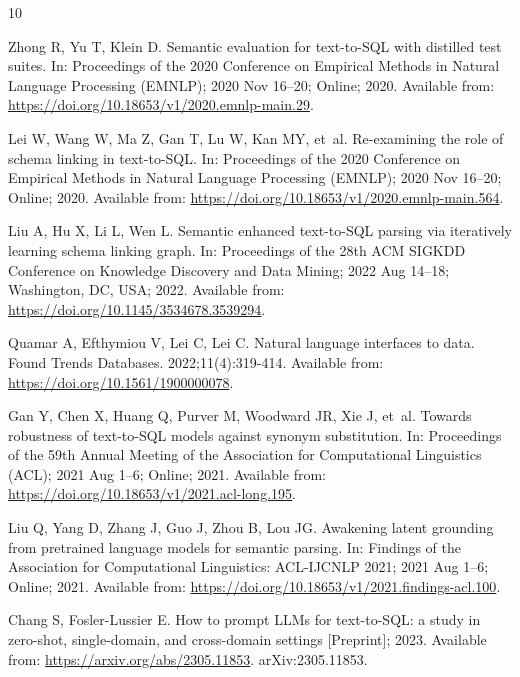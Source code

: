 \begin{thebibliography}{10}

Zhong R, Yu T, Klein D.
\newblock Semantic evaluation for text-to-SQL with distilled test suites.
\newblock In: Proceedings of the 2020 Conference on Empirical Methods in
  Natural Language Processing (EMNLP); 2020 Nov 16--20; Online; 2020. Available
  from: \url{https://doi.org/10.18653/v1/2020.emnlp-main.29}.

Lei W, Wang W, Ma Z, Gan T, Lu W, Kan MY, et~al.
\newblock Re-examining the role of schema linking in text-to-SQL.
\newblock In: Proceedings of the 2020 Conference on Empirical Methods in
  Natural Language Processing (EMNLP); 2020 Nov 16--20; Online; 2020. Available
  from: \url{https://doi.org/10.18653/v1/2020.emnlp-main.564}.

Liu A, Hu X, Li L, Wen L.
\newblock Semantic enhanced text-to-SQL parsing via iteratively learning schema
  linking graph.
\newblock In: Proceedings of the 28th ACM SIGKDD Conference on Knowledge
  Discovery and Data Mining; 2022 Aug 14--18; Washington, DC, USA; 2022.
  Available from: \url{https://doi.org/10.1145/3534678.3539294}.

Quamar A, Efthymiou V, Lei C, Lei C.
\newblock Natural language interfaces to data.
\newblock Found Trends Databases. 2022;11(4):319-414.
\newblock Available from: \url{https://doi.org/10.1561/1900000078}.

Gan Y, Chen X, Huang Q, Purver M, Woodward JR, Xie J, et~al.
\newblock Towards robustness of text-to-SQL models against synonym
  substitution.
\newblock In: Proceedings of the 59th Annual Meeting of the Association for
  Computational Linguistics (ACL); 2021 Aug 1--6; Online; 2021. Available from:
  \url{https://doi.org/10.18653/v1/2021.acl-long.195}.

Liu Q, Yang D, Zhang J, Guo J, Zhou B, Lou JG.
\newblock Awakening latent grounding from pretrained language models for
  semantic parsing.
\newblock In: Findings of the Association for Computational Linguistics:
  ACL-IJCNLP 2021; 2021 Aug 1--6; Online; 2021. Available from:
  \url{https://doi.org/10.18653/v1/2021.findings-acl.100}.

Chang S, Fosler-Lussier E.
\newblock How to prompt LLMs for text-to-SQL: a study in zero-shot,
  single-domain, and cross-domain settings [Preprint]; 2023.
\newblock Available from: \url{https://arxiv.org/abs/2305.11853}.
\newblock arXiv:2305.11853.


\end{thebibliography}
